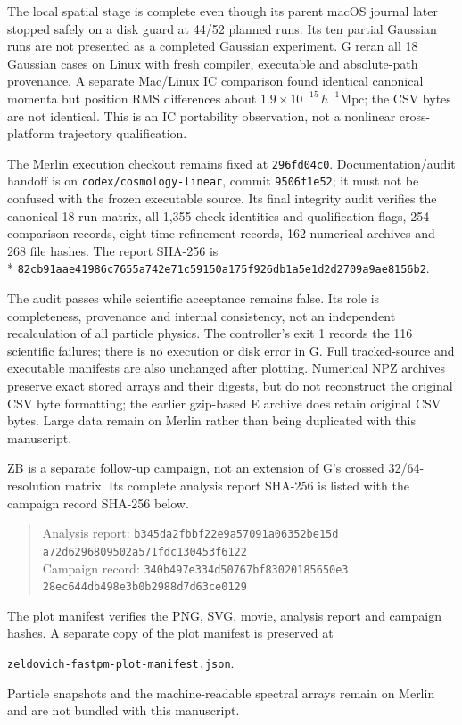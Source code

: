 The local spatial stage is complete even though its parent macOS journal later
stopped safely on a disk guard at 44/52 planned runs.  Its ten partial Gaussian
runs are not presented as a completed Gaussian experiment.  G reran all 18
Gaussian cases on Linux with fresh compiler, executable and absolute-path
provenance.  A separate Mac/Linux IC comparison found identical canonical
momenta but position RMS differences about $1.9\times10^{-15}\,h^{-1}\mathrm{Mpc}$;
the CSV bytes are not identical.  This is an IC portability observation, not
a nonlinear cross-platform trajectory qualification.

The Merlin execution checkout remains fixed at \texttt{296fd04c0}.
Documentation/audit handoff is on \texttt{codex/cosmology-linear}, commit
\texttt{9506f1e52}; it must not be confused with the frozen executable source.
Its final integrity audit verifies the canonical 18-run matrix, all 1,355
check identities and qualification flags, 254 comparison records, eight
time-refinement records, 162 numerical archives and 268 file hashes.
The report SHA-256 is\\*
{\footnotesize\texttt{82cb91aae41986c7655a742e71c59150a175f926db1a5e1d2d2709a9ae8156b2}.}

The audit passes while scientific acceptance remains false.  Its role is
completeness, provenance and internal consistency, not an independent
recalculation of all particle physics.  The controller's exit 1 records the
116 scientific failures; there is no execution or disk error in G.
Full tracked-source and executable manifests are also unchanged after plotting.
Numerical NPZ archives preserve exact stored arrays and their digests, but
do not reconstruct the original CSV byte formatting; the earlier gzip-based
E archive does retain original CSV bytes.  Large data remain on Merlin rather
than being duplicated with this manuscript.

ZB is a separate follow-up campaign, not an extension of G's crossed
32/64-resolution matrix.  Its complete analysis report SHA-256 is
listed with the campaign record SHA-256 below.
\begin{quote}\small
Analysis report: \texttt{b345da2fbbf22e9a57091a06352be15d}\\
\texttt{a72d6296809502a571fdc130453f6122}\\
Campaign record: \texttt{340b497e334d50767bf83020185650e3}\\
\texttt{28ec644db498e3b0b2988d7d63ce0129}
\end{quote}
The plot manifest verifies the PNG, SVG, movie, analysis report and campaign
hashes.  A separate copy of the plot manifest is preserved at
\par\smallskip\noindent
\nolinkurl{zeldovich-fastpm-plot-manifest.json}.\par\smallskip
Particle snapshots and the machine-readable spectral arrays remain on Merlin
and are not bundled with this manuscript.

